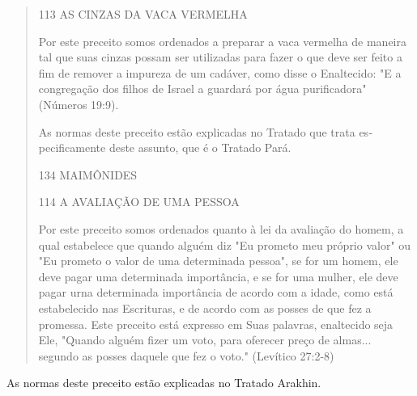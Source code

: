 \begin{quote}
113 AS CINZAS DA VACA VERMELHA

Por este preceito somos ordenados a preparar a vaca vermelha de maneira
tal que suas cinzas possam ser utilizadas para fazer o que deve ser
feito a fim de remover a impureza de um cadáver, como disse o
Enaltecido: "E a congregação dos filhos de Israel a guardará por água
purificadora" (Números 19:9).

As normas deste preceito estão explicadas no Tratado que trata
es­pecificamente deste assunto, que é o Tratado Pará.

134 MAIMÔNIDES

114 A AVALIAÇÃO DE UMA PESSOA

Por este preceito somos ordenados quanto à lei da avaliação do ho­mem, a
qual estabelece que quando alguém diz "Eu prometo meu próprio va­lor" ou
"Eu prometo o valor de uma determinada pessoa", se for um homem, ele
deve pagar uma determinada importância, e se for uma mulher, ele deve
pagar urna determinada importância de acordo com a idade, como está
estabe­lecido nas Escrituras, e de acordo com as posses de que fez a
promessa. Este preceito está expresso em Suas palavras, enaltecido seja
Ele, "Quando alguém fizer um voto, para oferecer preço de almas...
segundo as posses daquele que fez o voto." (Levítico 27:2-8)
\end{quote}

As normas deste preceito estão explicadas no Tratado Arakhin.

